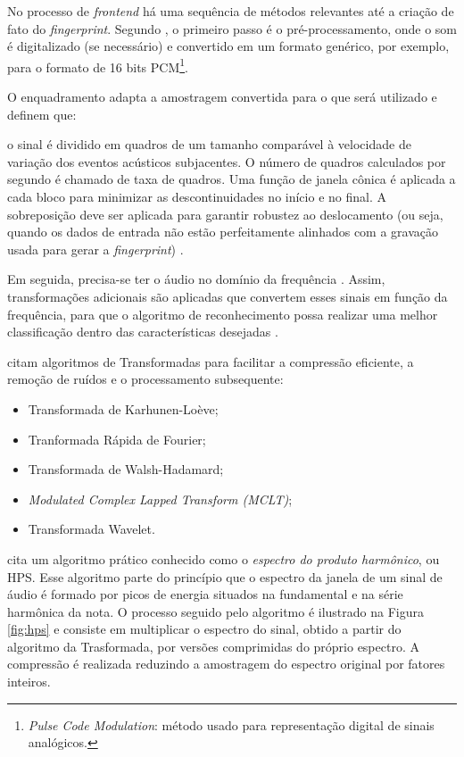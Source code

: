 No processo de \textit{frontend} há uma sequência de métodos relevantes até a criação de fato do \textit{fingerprint}. Segundo , o primeiro passo é o pré-processamento, onde o som é digitalizado (se necessário) e convertido em um formato genérico, por exemplo, para o formato de 16 bits PCM\footnote{\textit{Pulse Code Modulation}: método usado para representação digital de sinais analógicos.}.

O enquadramento adapta a amostragem convertida para o que será utilizado e  definem que:

\begin{citacao}
[...]o sinal é dividido em quadros de um tamanho comparável à velocidade de variação dos eventos acústicos subjacentes. O número de quadros calculados por segundo é chamado de taxa de quadros. Uma função de janela cônica é aplicada a cada bloco para minimizar as descontinuidades no início e no final. A sobreposição deve ser aplicada para garantir robustez ao deslocamento (ou seja, quando os dados de entrada não estão perfeitamente alinhados com a gravação usada para gerar a \textit{fingerprint}) \cite{cano2005}.
\end{citacao}

Em seguida, precisa-se ter o áudio no domínio da frequência \cite{bunnell1996a}. Assim, transformações adicionais são aplicadas que convertem esses sinais em função da frequência, para que o algoritmo de reconhecimento possa realizar uma melhor classificação dentro das características desejadas \cite{santos2011}.

 citam algoritmos de Transformadas para facilitar a compressão eficiente, a remoção de ruídos e o processamento subsequente:

\begin{itemize}
    \item Transformada de Karhunen-Loève;
    \item Tranformada Rápida de Fourier;
    \item Transformada de Walsh-Hadamard;
    \item \textit{Modulated Complex Lapped Transform (MCLT)};
    \item Transformada Wavelet.
\end{itemize}

 cita um algoritmo prático conhecido como o \textit{espectro do produto harmônico}, ou HPS. Esse algoritmo parte do princípio que o espectro da janela de um sinal de áudio é formado por picos de energia situados na fundamental e na série harmônica da nota. O processo seguido pelo algoritmo é ilustrado na Figura \ref{fig:hps} e consiste em multiplicar o espectro do sinal, obtido a partir do algoritmo da Trasformada, por versões comprimidas do próprio espectro. A compressão é realizada reduzindo a amostragem do espectro original por fatores inteiros.

